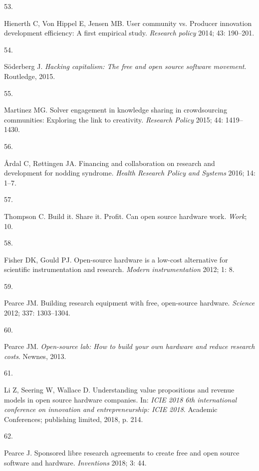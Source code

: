 \documentclass[
  12pt,
  a4paperpaper,
  onecolumn]{article}
\newlength{\cslhangindent}
\newlength{\csllabelwidth}
\newlength{\cslentryspacingunit} %
\newenvironment{CSLReferences}[2] %
 {%
  \setlength{\parindent}{0pt}
  \ifodd #1
  \let\oldpar\par
  \def\par{\hangindent=\cslhangindent\oldpar}
  \fi
  \setlength{\parskip}{#2\cslentryspacingunit}
 }%
 {}
\newcommand{\CSLLeftMargin}[1]{\parbox[t]{\csllabelwidth}{#1}}
\newcommand{\CSLRightInline}[1]{\parbox[t]{\linewidth - \csllabelwidth}{#1}\break}
\begin{document}
\begin{CSLReferences}{0}{0}
\leavevmode{}%
\CSLLeftMargin{53. }%
\CSLRightInline{Hienerth C, Von Hippel E, Jensen MB. User community vs.
Producer innovation development efficiency: A first empirical study.
\emph{Research policy} 2014; 43: 190--201.}

\leavevmode{}%
\CSLLeftMargin{54. }%
\CSLRightInline{Söderberg J. \emph{Hacking capitalism: The free and open
source software movement}. Routledge, 2015.}

\leavevmode{}%
\CSLLeftMargin{55. }%
\CSLRightInline{Martinez MG. Solver engagement in knowledge sharing in
crowdsourcing communities: Exploring the link to creativity.
\emph{Research Policy} 2015; 44: 1419--1430.}

\leavevmode{}%
\CSLLeftMargin{56. }%
\CSLRightInline{Årdal C, Røttingen JA. {Financing and collaboration on
research and development for nodding syndrome}. \emph{Health Research
Policy and Systems} 2016; 14: 1--7.}

\leavevmode{}%
\CSLLeftMargin{57. }%
\CSLRightInline{Thompson C. Build it. Share it. Profit. Can open source
hardware work. \emph{Work}; 10.}

\leavevmode{}%
\CSLLeftMargin{58. }%
\CSLRightInline{Fisher DK, Gould PJ. Open-source hardware is a low-cost
alternative for scientific instrumentation and research. \emph{Modern
instrumentation} 2012; 1: 8.}

\leavevmode{}%
\CSLLeftMargin{59. }%
\CSLRightInline{Pearce JM. Building research equipment with free,
open-source hardware. \emph{Science} 2012; 337: 1303--1304.}

\leavevmode{}%
\CSLLeftMargin{60. }%
\CSLRightInline{Pearce JM. \emph{Open-source lab: How to build your own
hardware and reduce research costs}. Newnes, 2013.}

\leavevmode{}%
\CSLLeftMargin{61. }%
\CSLRightInline{Li Z, Seering W, Wallace D. Understanding value
propositions and revenue models in open source hardware companies. In:
\emph{ICIE 2018 6th international conference on innovation and
entrepreneurship: ICIE 2018}. Academic Conferences; publishing limited,
2018, p. 214.}

\leavevmode{}%
\CSLLeftMargin{62. }%
\CSLRightInline{Pearce J. Sponsored libre research agreements to create
free and open source software and hardware. \emph{Inventions} 2018; 3:
44.}


\end{CSLReferences}
\end{document}
